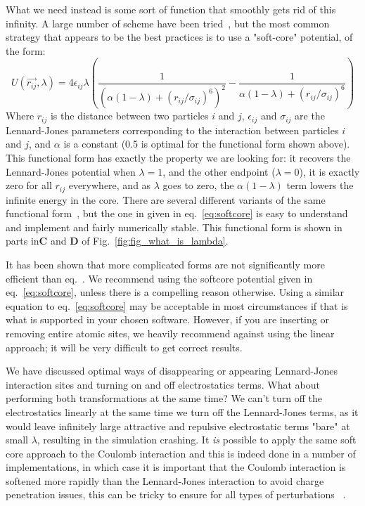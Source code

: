 \documentclass[9pt,bestpractices]{livecoms}
\begin{document}
What we need instead is some sort of function that smoothly gets rid of this infinity. A large number of scheme have been tried~\cite{beutler1994avoiding, zacharias1994separationshifted, blondel2004ensemble, pham2011identifying, pham2012optimal, naden2014linear, donnini2005molecular}, but the most common strategy that appears to be the best practices is to use a "soft-core" potential, of the form:
%
\begin{equation}
    U(\vec{r_{ij}},\lambda) = 4\epsilon_{ij} \lambda \left(\frac{1}{(\alpha(1-\lambda) + (r_{ij}/\sigma_{ij})^6)^2} -  \frac{1}{\alpha(1-\lambda) + (r_{ij}/\sigma_{ij})^6}\right)
    \label{eq:softcore}
\end{equation}
%
Where $r_{ij}$ is the distance between two particles $i$ and $j$, $\epsilon_{ij}$ and $\sigma_{ij}$ are the Lennard-Jones parameters corresponding to the interaction between particles $i$ and $j$, and $\alpha$ is a constant (0.5 is optimal for the functional form shown above).  This functional form has exactly the property we are looking for: it recovers the Lennard-Jones potential when $\lambda=1$, and the other endpoint ($\lambda=0$), it is exactly zero for all $r_{ij}$ everywhere, and as $\lambda$ goes to zero, the  $\alpha(1-\lambda)$ term lowers the infinite energy in the core.  There are several different variants of the same functional form~\cite{zacharias1994separationshifted, beutler1994avoiding,pham2011identifying}, but the one in given in eq.~\ref{eq:softcore} is easy to understand and implement and fairly numerically stable. This functional form is shown in parts in\textbf{C} and \textbf{D} of Fig.~\ref{fig:fig_what_is_lambda}.

It has been shown that more complicated forms are not significantly more efficient than eq.~\cite{pham2012optimal}.  We recommend using the softcore potential given in eq.~\ref{eq:softcore}, unless there is a compelling reason otherwise. Using a similar equation to eq.~\ref{eq:softcore} may be acceptable in most circumstances if that is what is supported in your chosen software. However, if you are inserting or removing entire atomic sites, we heavily recommend against using the linear approach; it will be very difficult to get correct results. 

We have discussed optimal ways of disappearing or appearing Lennard-Jones interaction sites and turning on and off electrostatics terms. What about performing both transformations at the same time? We can't turn off the electrostatics linearly at the same time we turn off the Lennard-Jones terms, as it would leave infinitely large attractive and repulsive electrostatic terms "bare" at small $\lambda$, resulting in the simulation crashing. It \textit{is} possible to apply the same soft core approach to the Coulomb interaction and this is indeed done in a number of implementations, in which case it is important that the Coulomb interaction is softened more rapidly than the Lennard-Jones interaction to avoid charge penetration issues, this can be tricky to ensure for all types of perturbations ~\cite{steinbrecher2011softcore}. 
\end{document}
